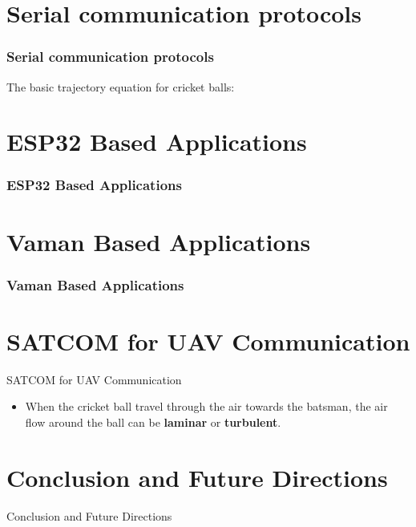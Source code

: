 \documentclass{beamer}
\begin{document}
\section{Serial communication protocols}
\begin{frame}
\frametitle{Serial communication protocols}
The basic trajectory equation for cricket balls:\\

\end{frame}

\section{ESP32 Based Applications}
\begin{frame}
\frametitle{ESP32 Based Applications}

\end{frame}

\section{Vaman Based Applications}
\begin{frame}
\frametitle{Vaman Based Applications}
\end{frame}

\section{SATCOM for UAV Communication}
\begin{frame}{SATCOM for UAV Communication}
    \begin{itemize}
    \item 
    When the cricket ball travel through the air towards the batsman, the air flow around the ball can be \textbf{laminar} or \textbf{turbulent}.
  \end{itemize}
\end{frame} 

\section{Conclusion and Future Directions}
\begin{frame}{Conclusion and Future Directions}
    
  
\end{frame} 





\end{document}
